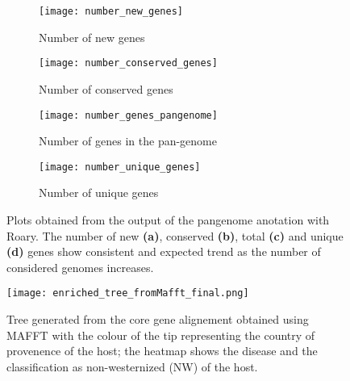 \graphicspath{{images/pangenomeAnalysis/}{images/phylogeneticStructureHostData}}


\begin{figure}[h!] 
     \centering
     \begin{subfigure}[b]{0.45\textwidth}
        \centering
        \texttt{[image: number\_new\_genes]}
        \caption{Number of new genes}
        \label{fig:new genes}
     \end{subfigure}
     \hfill
     \begin{subfigure}[b]{0.45\textwidth}
        \centering
        \texttt{[image: number\_conserved\_genes]}
        \caption{Number of conserved genes}
        \label{fig:conserved genes}
     \end{subfigure}
     \hfill
     \begin{subfigure}[b]{0.45\textwidth}
        \centering
        \texttt{[image: number\_genes\_pangenome]}
        \caption{Number of genes in the pan-genome}
        \label{fig:pagenome genes}
     \end{subfigure}
     \hfill
     \begin{subfigure}[b]{0.45\textwidth}
        \centering
        \texttt{[image: number\_unique\_genes]}
        \caption{Number of unique genes}
        \label{fig:unique genes}
     \end{subfigure}
     \hfill
      \caption{\footnotesize{Plots obtained from the output of the pangenome anotation with Roary. The number of new \textbf{(a)}, conserved
      \textbf{(b)}}, total \textbf{(c)} and unique \textbf{(d)} genes show consistent and 
      expected trend as the number of considered genomes increases.}
      \label{fig:genes vs genomes}
\end{figure}




\begin{figure}
   \centering
   \texttt{[image: enriched\_tree\_fromMafft\_final.png]}
   \caption{\footnotesize{Tree generated from the core gene alignement
   obtained using MAFFT with the colour of the tip representing the country
   of provenence of the host; the heatmap shows the disease and the classification as 
   non-westernized (NW) of the host.}}
   \label{core alignement mafft tree}
\end{figure}


